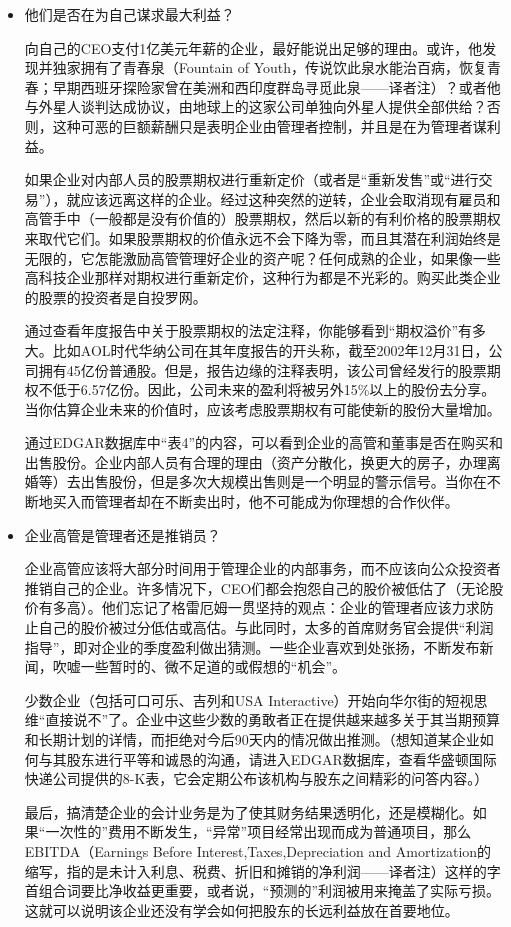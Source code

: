 \documentclass[12pt,oneside]{book}
\begin{document}
\begin{itemize}
\item 他们是否在为自己谋求最大利益？

向自己的CEO支付1亿美元年薪的企业，最好能说出足够的理由。或许，他发现并独家拥有了青春泉（Fountain of Youth，传说饮此泉水能治百病，恢复青春；早期西班牙探险家曾在美洲和西印度群岛寻觅此泉——译者注）？或者他与外星人谈判达成协议，由地球上的这家公司单独向外星人提供全部供给？否则，这种可恶的巨额薪酬只是表明企业由管理者控制，并且是在为管理者谋利益。

如果企业对内部人员的股票期权进行重新定价（或者是“重新发售”或“进行交易”），就应该远离这样的企业。经过这种突然的逆转，企业会取消现有雇员和高管手中（一般都是没有价值的）股票期权，然后以新的有利价格的股票期权来取代它们。如果股票期权的价值永远不会下降为零，而且其潜在利润始终是无限的，它怎能激励高管管理好企业的资产呢？任何成熟的企业，如果像一些高科技企业那样对期权进行重新定价，这种行为都是不光彩的。购买此类企业的股票的投资者是自投罗网。

通过查看年度报告中关于股票期权的法定注释，你能够看到“期权溢价”有多大。比如AOL时代华纳公司在其年度报告的开头称，截至2002年12月31日，公司拥有45亿份普通股。但是，报告边缘的注释表明，该公司曾经发行的股票期权不低于6.57亿份。因此，公司未来的盈利将被另外15\%以上的股份去分享。当你估算企业未来的价值时，应该考虑股票期权有可能使新的股份大量增加。

通过EDGAR数据库中“表4”的内容，可以看到企业的高管和董事是否在购买和出售股份。企业内部人员有合理的理由（资产分散化，换更大的房子，办理离婚等）去出售股份，但是多次大规模出售则是一个明显的警示信号。当你在不断地买入而管理者却在不断卖出时，他不可能成为你理想的合作伙伴。
\item 企业高管是管理者还是推销员？

企业高管应该将大部分时间用于管理企业的内部事务，而不应该向公众投资者推销自己的企业。许多情况下，CEO们都会抱怨自己的股价被低估了（无论股价有多高）。他们忘记了格雷厄姆一贯坚持的观点：企业的管理者应该力求防止自己的股价被过分低估或高估。与此同时，太多的首席财务官会提供“利润指导”，即对企业的季度盈利做出猜测。一些企业喜欢到处张扬，不断发布新闻，吹嘘一些暂时的、微不足道的或假想的“机会”。

少数企业（包括可口可乐、吉列和USA Interactive）开始向华尔街的短视思维“直接说不”了。企业中这些少数的勇敢者正在提供越来越多关于其当期预算和长期计划的详情，而拒绝对今后90天内的情况做出推测。（想知道某企业如何与其股东进行平等和诚恳的沟通，请进入EDGAR数据库，查看华盛顿国际快递公司提供的8-K表，它会定期公布该机构与股东之间精彩的问答内容。）

最后，搞清楚企业的会计业务是为了使其财务结果透明化，还是模糊化。如果“一次性的”费用不断发生，“异常”项目经常出现而成为普通项目，那么EBITDA（Earnings Before Interest,Taxes,Depreciation and Amortization的缩写，指的是未计入利息、税费、折旧和摊销的净利润——译者注）这样的字首组合词要比净收益更重要，或者说，“预测的”利润被用来掩盖了实际亏损。这就可以说明该企业还没有学会如何把股东的长远利益放在首要地位。


\end{itemize}
\end{document}
